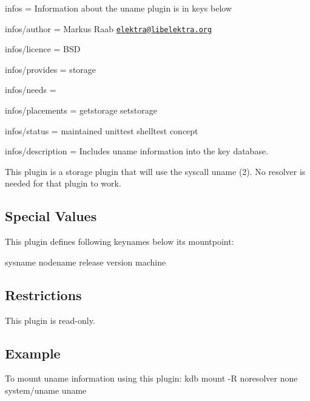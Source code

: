 
\begin{DoxyItemize}
\item infos = Information about the uname plugin is in keys below
\item infos/author = Markus Raab \href{mailto:elektra@libelektra.org}{\tt elektra@libelektra.\+org}
\item infos/licence = B\+S\+D
\item infos/provides = storage
\item infos/needs =
\item infos/placements = getstorage setstorage
\item infos/status = maintained unittest shelltest concept
\item infos/description = Includes uname information into the key database.
\end{DoxyItemize}

This plugin is a storage plugin that will use the syscall {\ttfamily uname (2)}. No resolver is needed for that plugin to work.

\subsection*{Special Values}

This plugin defines following keynames below its mountpoint\+: \begin{DoxyVerb}    sysname
    nodename
    release
    version
    machine
\end{DoxyVerb}


\subsection*{Restrictions}

This plugin is read-\/only.

\subsection*{Example}

To mount uname information using this plugin\+: {\ttfamily kdb mount -\/\+R noresolver none system/uname uname} 